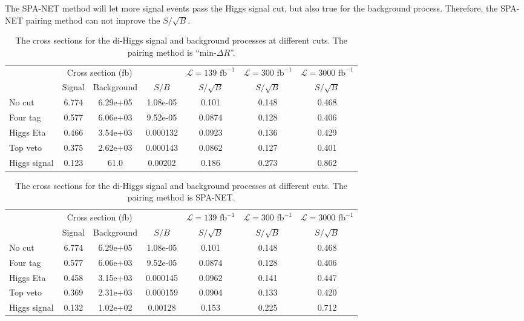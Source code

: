 \documentclass[12pt]{article}
\begin{document}
		The SPA-NET method will let more signal events pass the Higgs signal cut, but also true for the background process. Therefore, the SPA-NET pairing method can not improve the $S/\sqrt{B}$.
		\begin{table}[htpb]
			\centering
			\caption{The cross sections for the di-Higgs signal and background processes at different cuts. The pairing method is ``$\text{min-}\Delta R$''.}
			\label{tab:diHiggs_signal_background_analysis_ATLAS_mindR}
			\begin{tabular}{l|cc|c|c|c|c}
							 & \multicolumn{2}{c|}{Cross section (fb)} &          & $\mathcal{L} = 139 \text{ fb}^{-1}$ & $\mathcal{L} = 300 \text{ fb}^{-1}$ & $\mathcal{L} = 3000 \text{ fb}^{-1}$ \\
							 & Signal           & Background           & $S / B$  & $S/\sqrt{B}$                        & $S/\sqrt{B}$                        & $S/\sqrt{B}$                         \\ \hline
				No cut       & 6.774 & 6.29e+05 & 1.08e-05 & 0.101  & 0.148 & 0.468 \\
				Four tag     & 0.577 & 6.06e+03 & 9.52e-05 & 0.0874 & 0.128 & 0.406 \\
				Higgs Eta    & 0.466 & 3.54e+03 & 0.000132 & 0.0923 & 0.136 & 0.429 \\
				Top veto     & 0.375 & 2.62e+03 & 0.000143 & 0.0862 & 0.127 & 0.401 \\
				Higgs signal & 0.123 & 61.0     & 0.00202  & 0.186  & 0.273 & 0.862
			\end{tabular}	
		\end{table}

		\begin{table}[htpb]
			\centering
			\caption{The cross sections for the di-Higgs signal and background processes at different cuts. The pairing method is SPA-NET.}
			\label{tab:diHiggs_signal_background_analysis_ATLAS_SPANet}
			\begin{tabular}{l|cc|c|c|c|c}
							 & \multicolumn{2}{c|}{Cross section (fb)} &          & $\mathcal{L} = 139 \text{ fb}^{-1}$ & $\mathcal{L} = 300 \text{ fb}^{-1}$ & $\mathcal{L} = 3000 \text{ fb}^{-1}$ \\
							 & Signal           & Background           & $S / B$  & $S/\sqrt{B}$                        & $S/\sqrt{B}$                        & $S/\sqrt{B}$                         \\ \hline
				No cut       & 6.774 & 6.29e+05 & 1.08e-05 & 0.101  & 0.148 & 0.468 \\
				Four tag     & 0.577 & 6.06e+03 & 9.52e-05 & 0.0874 & 0.128 & 0.406 \\
				Higgs Eta    & 0.458 & 3.15e+03 & 0.000145 & 0.0962 & 0.141 & 0.447 \\
				Top veto     & 0.369 & 2.31e+03 & 0.000159 & 0.0904 & 0.133 & 0.420 \\
				Higgs signal & 0.132 & 1.02e+02 & 0.00128  & 0.153  & 0.225 & 0.712			
			\end{tabular}
		\end{table}

\end{document}
